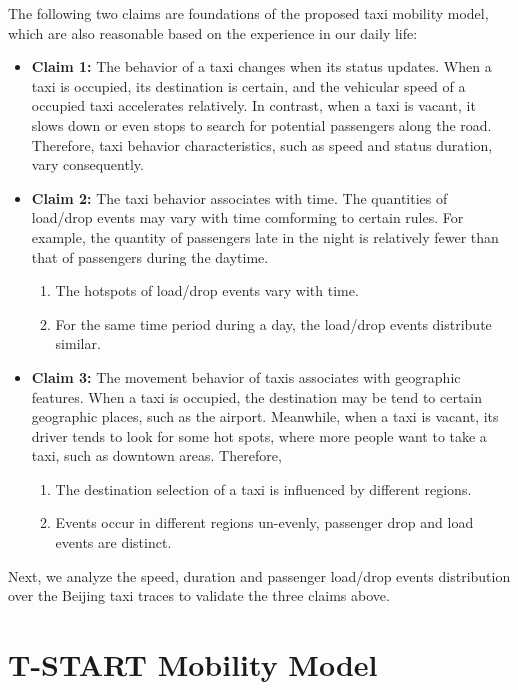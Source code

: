 \documentclass[10pt,journal,compsocconf,letterpaper]{IEEEtran}
\begin{document}
The following two claims are foundations of the proposed taxi mobility model, which are also reasonable based on the experience in our daily life:
\begin{itemize}
  \item \textbf{Claim 1:} The behavior of a taxi changes when its status updates. When a taxi is occupied, its destination is certain, and the vehicular speed of a occupied taxi accelerates relatively. In contrast, when a taxi is vacant, it slows down or even stops to search for potential passengers along the road. Therefore, taxi behavior characteristics, such as speed and status duration, vary consequently.
 \item \textbf{Claim 2:} The taxi behavior associates with time. The quantities of load/drop events may vary with time comforming to certain rules. For example, the quantity of passengers late in the night is relatively fewer than that of passengers during the daytime. 
      \begin{enumerate}
        \item The hotspots of load/drop events vary with time.
        \item For the same time period during a day, the load/drop events distribute similar.
      \end{enumerate}
  \item \textbf{Claim 3:} The movement behavior of taxis associates with geographic features. When a taxi is occupied, the destination may be tend to certain geographic places, such as the airport. Meanwhile, when a taxi is vacant, its driver tends to look for some hot spots, where more people want to take a taxi, such as downtown areas. Therefore,
      \begin{enumerate}
        \item The destination selection of a taxi is influenced by different regions.
        \item Events occur in different regions un-evenly, passenger drop and load events are distinct.
      \end{enumerate}
\end{itemize}
Next, we analyze the speed, duration and passenger load/drop events distribution over the Beijing taxi traces to validate the three claims above.




\section{T-START Mobility Model}
\label{section_modeling}
\end{document}
